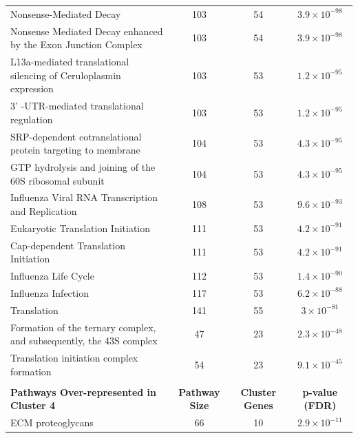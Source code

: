 \begin{table}[!hp]
{\begin{tabular}{lccc}
  \rowcolor{Cluster_Orange!30} 
  Nonsense-Mediated Decay & 103 &  54 & $3.9 \times 10^{-98}$ \\ 
  \rowcolor{Cluster_Orange!20} 
  Nonsense Mediated Decay enhanced by the Exon Junction Complex & 103 &  54 & $3.9 \times 10^{-98}$ \\ 
  \rowcolor{Cluster_Orange!30} 
  L13a-mediated translational silencing of Ceruloplasmin expression & 103 &  53 & $1.2 \times 10^{-95}$ \\ 
  \rowcolor{Cluster_Orange!20} 
  3' -UTR-mediated translational regulation & 103 &  53 & $1.2 \times 10^{-95}$ \\ 
  \rowcolor{Cluster_Orange!30} 
  SRP-dependent cotranslational protein targeting to membrane & 104 &  53 & $4.3 \times 10^{-95}$ \\ 
  \rowcolor{Cluster_Orange!20} 
  GTP hydrolysis and joining of the 60S ribosomal subunit & 104 &  53 & $4.3 \times 10^{-95}$ \\ 
  \rowcolor{Cluster_Orange!30} 
  Influenza Viral RNA Transcription and Replication & 108 &  53 & $9.6 \times 10^{-93}$ \\ 
  \rowcolor{Cluster_Orange!20} 
  Eukaryotic Translation Initiation & 111 &  53 & $4.2 \times 10^{-91}$ \\ 
  \rowcolor{Cluster_Orange!30} 
  Cap-dependent Translation Initiation & 111 &  53 & $4.2 \times 10^{-91}$ \\ 
  \rowcolor{Cluster_Orange!20} 
  Influenza Life Cycle & 112 &  53 & $1.4 \times 10^{-90}$ \\ 
  \rowcolor{Cluster_Orange!30} 
  Influenza Infection & 117 &  53 & $6.2 \times 10^{-88}$ \\ 
  \rowcolor{Cluster_Orange!20} 
  Translation & 141 &  55 & $3 \times 10^{-81}$ \\ 
  \rowcolor{Cluster_Orange!30} 
  Formation of the ternary complex, and subsequently, the 43S complex &  47 &  23 & $2.3 \times 10^{-48}$ \\ 
  \rowcolor{Cluster_Orange!20} 
  Translation initiation complex formation &  54 &  23 & $9.1 \times 10^{-45}$ \\ 
  \hline
  \\ 
  \cellcolor{white} \large{\textbf{Pathways Over-represented in Cluster 4}} & \large{\textbf{Pathway Size}} & \large{\textbf{Cluster Genes}} & \large{\textbf{p-value (FDR)}} \\ %
  \hline 
  \rowcolor{Cluster_Red!20}
  ECM proteoglycans &  66 &  10 & $2.9 \times 10^{-11}$ \\ 

\end{tabular}}
\end{table}
